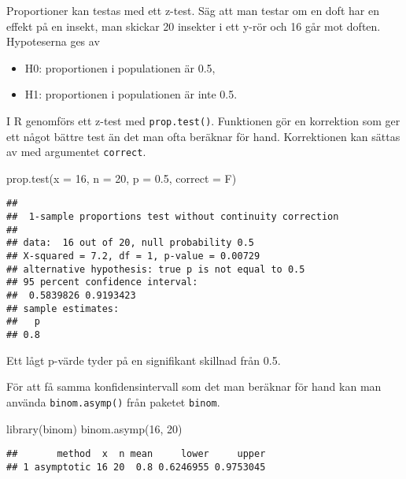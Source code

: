 \documentclass[
]{book}
\newenvironment{Shaded}{\begin{snugshade}}{\end{snugshade}}
\newcommand{\AttributeTok}[1]{\textcolor[rgb]{0.77,0.63,0.00}{#1}}
\newcommand{\DecValTok}[1]{\textcolor[rgb]{0.00,0.00,0.81}{#1}}
\newcommand{\FloatTok}[1]{\textcolor[rgb]{0.00,0.00,0.81}{#1}}
\newcommand{\FunctionTok}[1]{\textcolor[rgb]{0.00,0.00,0.00}{#1}}
\newcommand{\NormalTok}[1]{#1}
\providecommand{\tightlist}{%
  \setlength{\itemsep}{0pt}\setlength{\parskip}{0pt}}
\theoremstyle{definition}
\theoremstyle{definition}
\theoremstyle{definition}
\theoremstyle{definition}
\theoremstyle{remark}
\begin{document}
Proportioner kan testas med ett z-test. Säg att man testar om en doft har en effekt på en insekt, man skickar 20 insekter i ett y-rör och 16 går mot doften. Hypoteserna ges av

\begin{itemize}
\tightlist
\item
  H0: proportionen i populationen är 0.5,
\item
  H1: proportionen i populationen är inte 0.5.
\end{itemize}

I R genomförs ett z-test med \texttt{prop.test()}. Funktionen gör en korrektion som ger ett något bättre test än det man ofta beräknar för hand. Korrektionen kan sättas av med argumentet \texttt{correct}.

\begin{Shaded}
\begin{Highlighting}[]
\FunctionTok{prop.test}\NormalTok{(}\AttributeTok{x =} \DecValTok{16}\NormalTok{, }\AttributeTok{n =} \DecValTok{20}\NormalTok{, }\AttributeTok{p =} \FloatTok{0.5}\NormalTok{, }\AttributeTok{correct =}\NormalTok{ F)}
\end{Highlighting}
\end{Shaded}

\begin{verbatim}
## 
##  1-sample proportions test without continuity correction
## 
## data:  16 out of 20, null probability 0.5
## X-squared = 7.2, df = 1, p-value = 0.00729
## alternative hypothesis: true p is not equal to 0.5
## 95 percent confidence interval:
##  0.5839826 0.9193423
## sample estimates:
##   p 
## 0.8
\end{verbatim}

Ett lågt p-värde tyder på en signifikant skillnad från 0.5.

För att få samma konfidensintervall som det man beräknar för hand kan man använda \texttt{binom.asymp()} från paketet \texttt{binom}.

\begin{Shaded}
\begin{Highlighting}[]
\FunctionTok{library}\NormalTok{(binom)}
\FunctionTok{binom.asymp}\NormalTok{(}\DecValTok{16}\NormalTok{, }\DecValTok{20}\NormalTok{)}
\end{Highlighting}
\end{Shaded}

\begin{verbatim}
##       method  x  n mean     lower     upper
## 1 asymptotic 16 20  0.8 0.6246955 0.9753045
\end{verbatim}
\end{document}
